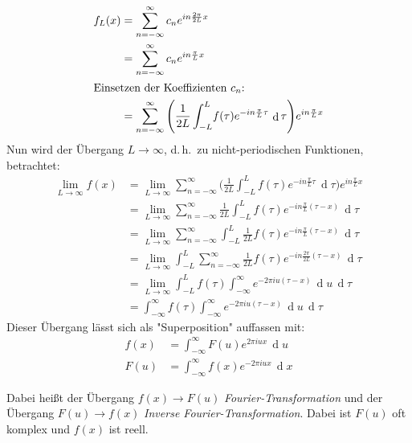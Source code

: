 \documentclass[a4paper, 11pt, accentcolor = tud3b]{tudreport}
\DeclareMathOperator{\total}{d}
\newcommand{\dif}[1]{\,\total#1}
\renewcommand{\dh}{d.\,h.~}
\begin{document}
			\begin{align*}
				f_L(x) &= \sum_{n = -\infty}^{\infty} c_n e^{in \frac{2\pi}{2L} x} \\
					 &= \sum_{n = -\infty}^{\infty} c_n e^{in \frac{\pi}{L} x} \\
				\intertext{Einsetzen der Koeffizienten \(c_n\):}
					&= \sum_{n = -\infty}^{\infty} \Bigg( \frac{1}{2L} \int_{-L}^{L} \! f(\tau) e^{-in \frac{\pi}{L} \tau} \dif{\tau} \Bigg) e^{in \frac{\pi}{L} x}
			\end{align*}
			Nun wird der Übergang \( L \to \infty \), \dh zu nicht-periodischen Funktionen, betrachtet:
			\begin{align*}
				\lim\limits_{L \to \infty} f(x)
					&= \lim\limits_{L \to \infty} \sum_{n = -\infty}^{\infty} \Bigg( \frac{1}{2L} \int_{-L}^{L} \! f(\tau) e^{-in \frac{\pi}{L} \tau} \dif{\tau} \Bigg) e^{in \frac{\pi}{L} x} \\
					&= \lim\limits_{L \to \infty} \sum_{n = -\infty}^{\infty} \frac{1}{2L} \int_{-L}^{L} \! f(\tau) e^{-in \frac{\pi}{L} (\tau - x)} \dif{\tau} \\
					&= \lim\limits_{L \to \infty} \sum_{n = -\infty}^{\infty} \int_{-L}^{L} \! \frac{1}{2L} f(\tau) e^{-in \frac{\pi}{L} (\tau - x)} \dif{\tau} \\
					&= \lim\limits_{L \to \infty} \int_{-L}^{L} \sum_{n = -\infty}^{\infty} \frac{1}{2L} f(\tau) e^{-in \frac{2\pi}{2L} (\tau - x)} \dif{\tau} \\
					&= \lim\limits_{L \to \infty} \int_{-L}^{L} \! f(\tau) \int_{-\infty}^{\infty} \! e^{-2\pi i u (\tau - x)} \dif{u} \dif{\tau} \\
					&= \int_{-\infty}^{\infty} \! f(\tau) \int_{-\infty}^{\infty} \! e^{-2\pi i u (\tau - x)} \dif{u} \dif{\tau}
			\end{align*}
			Dieser Übergang lässt sich als "Superposition" auffassen mit:
			\begin{align*}
				f(x) &= \int_{-\infty}^{\infty} \! F(u) e^{ 2\pi i u x} \dif{u} \\
				F(u) &= \int_{-\infty}^{\infty} \! f(x) e^{-2\pi i u x} \dif{x}
			\end{align*}
			
			Dabei heißt der Übergang \( f(x) \to F(u) \) \emph{Fourier-Transformation} und der Übergang \( F(u) \to f(x) \) \emph{Inverse Fourier-Transformation}. Dabei ist \(F(u)\) oft komplex und \(f(x)\) ist reell.
\end{document}
